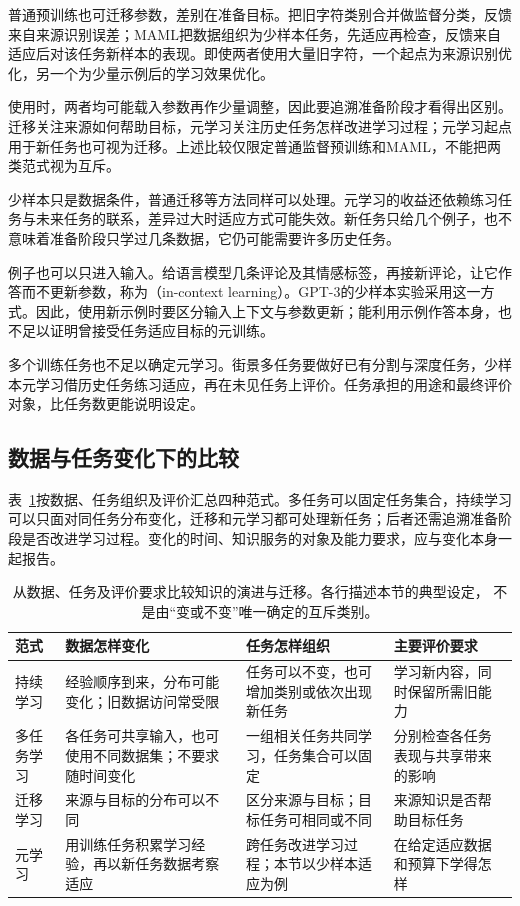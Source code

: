 普通预训练也可迁移参数，差别在准备目标。把旧字符类别合并做监督分类，反馈来自来源识别误差；MAML把数据组织为少样本任务，先适应再检查，反馈来自适应后对该任务新样本的表现。即使两者使用大量旧字符，一个起点为来源识别优化，另一个为少量示例后的学习效果优化。

使用时，两者均可能载入参数再作少量调整，因此要追溯准备阶段才看得出区别。迁移关注来源如何帮助目标，元学习关注历史任务怎样改进学习过程；元学习起点用于新任务也可视为迁移。上述比较仅限定普通监督预训练和MAML，不能把两类范式视为互斥。

少样本只是数据条件，普通迁移等方法同样可以处理。元学习的收益还依赖练习任务与未来任务的联系，差异过大时适应方式可能失效。新任务只给几个例子，也不意味着准备阶段只学过几条数据，它仍可能需要许多历史任务。

例子也可以只进入输入。给语言模型几条评论及其情感标签，再接新评论，让它作答而不更新参数，称为（in-context learning）。GPT-3的少样本实验采用这一方式。因此，使用新示例时要区分输入上下文与参数更新；能利用示例作答本身，也不足以证明曾接受任务适应目标的元训练。

多个训练任务也不足以确定元学习。街景多任务要做好已有分割与深度任务，少样本元学习借历史任务练习适应，再在未见任务上评价。任务承担的用途和最终评价对象，比任务数更能说明设定。

\FloatBarrier
\subsection{数据与任务变化下的比较}
\label{sec:knowledge-evolution-comparison}

表~\ref{tab:knowledge-evolution-comparison}按数据、任务组织及评价汇总四种范式。多任务可以固定任务集合，持续学习可以只面对同任务分布变化，迁移和元学习都可处理新任务；后者还需追溯准备阶段是否改进学习过程。变化的时间、知识服务的对象及能力要求，应与变化本身一起报告。

\begin{table}[htbp]
  \centering
  \small
  \begin{tabularx}{\linewidth}{@{}lXXX@{}}
    \toprule
    \textbf{范式} & \textbf{数据怎样变化} & \textbf{任务怎样组织} & \textbf{主要评价要求} \\
    \midrule
    持续学习 & 经验顺序到来，分布可能变化；旧数据访问常受限 & 任务可以不变，也可增加类别或依次出现新任务 & 学习新内容，同时保留所需旧能力 \\
    多任务学习 & 各任务可共享输入，也可使用不同数据集；不要求随时间变化 & 一组相关任务共同学习，任务集合可以固定 & 分别检查各任务表现与共享带来的影响 \\
    迁移学习 & 来源与目标的分布可以不同 & 区分来源与目标；目标任务可相同或不同 & 来源知识是否帮助目标任务 \\
    元学习 & 用训练任务积累学习经验，再以新任务数据考察适应 & 跨任务改进学习过程；本节以少样本适应为例 & 在给定适应数据和预算下学得怎样 \\
    \bottomrule
  \end{tabularx}
  \caption{从数据、任务及评价要求比较知识的演进与迁移。各行描述本节的典型设定，
  不是由“变或不变”唯一确定的互斥类别。}
  \label{tab:knowledge-evolution-comparison}
\end{table}
\FloatBarrier

